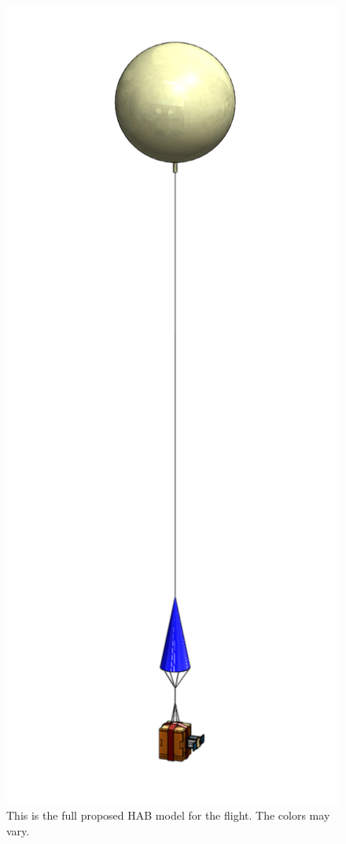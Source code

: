 \documentclass[conference]{IEEEtran} %
\begin{document}
\begin{figure}
  \includegraphics[width = \linewidth]{figs/full_HAB_model.png}
  \caption{This is the full proposed HAB model for the flight. The colors may vary.}
\end{figure}
\end{document}
